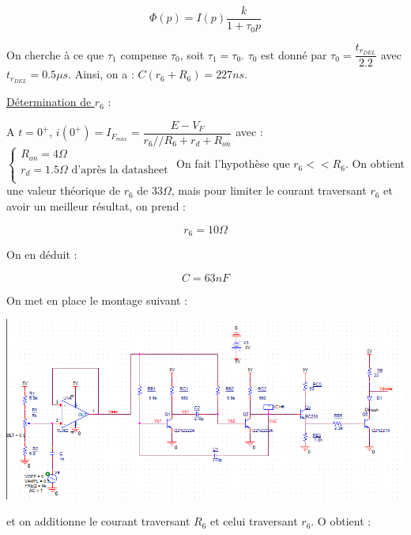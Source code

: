 \documentclass[a4paper]{report}
\begin{document}
$$\Phi(p) =I(p) \dfrac{k}{1+\tau_0p}$$

On cherche  à ce que $\tau_1$ compense $\tau_0$, soit $\tau_1 = \tau_0$.
$\tau_0$ est donné par $\tau_0 = \dfrac{t_{r_{DEL}}}{2.2}$ avec $t_{r_{DEL}} = 0.5\mu s$.
Ainsi, on a : $C(r_6+R_6) = 227ns$.\newline

\underline{Détermination de $r_6$} :\newline

A $t = 0^+$, $i(0^+) = I_{F_{max}} = \dfrac{E-V_F}{r_6//R_6 + r_d + R_{on}}$ avec :\newline
\newline
$\left\{
\begin{array}{l}
  R_{on} = 4\Omega\\
  r_d = 1.5\Omega \mbox{    d'après la datasheet}\\
\end{array}
\right.$
\newline
\newline
On fait l'hypothèse que $r_6<<R_6$. On obtient une valeur théorique de $r_6$ de $33\Omega$, mais pour limiter le courant traversant $r_6$ et avoir un meilleur résultat, on prend :

$$r_6 = 10\Omega$$

On en déduit :

$$C = 63nF$$

On met en place le montage suivant :

\begin{center}
\includegraphics[width=1\textwidth]{Montage_DEL.PNG}
\end{center}

et on additionne le courant traversant $R_6$ et celui traversant $r_6$. O obtient :
\end{document}
